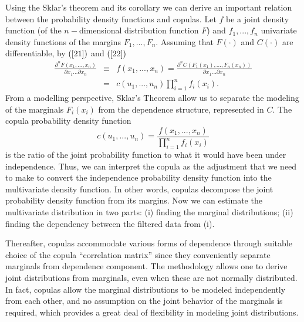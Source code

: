\documentclass[a4paper,10pt]{article}
\begin{document}
Using the Sklar's theorem and its corollary we can derive an important
relation between the probability density functions and copulas. Let $f$ be a
joint density function (of the $n-$dimensional distribution function $F$)
and $f_{1},...,f_{n}$ univariate density functions of the margins $%
F_{1},...,F_{n}$. Assuming that $F\left( \cdot \right) $ and $C\left( \cdot
\right) $ are differentiable, by $\left( \ref{21}\right) $ and $\left( \ref%
{22}\right) $
\begin{eqnarray}
\frac{\partial ^{n}F\left( x_{1},...,x_{n}\right) }{\partial
	x_{1}...\partial x_{n}} &\equiv &f\left( x_{1},...,x_{n}\right) =\frac{
	\partial ^{n}C\left( F_{1}\left( x_{1}\right) ,...,F_{n}\left( x_{n}\right)
	\right) }{\partial x_{1}...\partial x_{n}} \\
&=&c\left( u_{1},...,u_{n}\right) \prod_{i=1}^{n}f_{i}\left( x_{i}\right) .
\label{23}
\end{eqnarray}%
From a modelling perspective, Sklar's Theorem allow us to separate the
modeling of the marginals $F_{i}\left( x_{i}\right) $ from the dependence
structure, represented in $C$. The copula probability density function
\begin{equation}
c\left( u_{1},...,u_{n}\right) =\frac{f\left( x_{1},...,x_{n}\right) }{
	\prod_{i=1}^{n}f_{i}\left( x_{i}\right) }  \label{24}
\end{equation}%
is the ratio of the joint probability function to what it would have been
under independence. Thus, we can interpret the copula as the adjustment that
we need to make to convert the independence probability density function
into the multivariate density function. In other words, copulas decompose
the joint probability density function from its margins. Now we can estimate
the multivariate distribution in two parts: (i) finding the marginal
distributions; (ii) finding the dependency between the filtered data from
(i). 

Thereafter, copulas accommodate various forms of dependence through suitable choice of the copula ``correlation matrix'' since they conveniently separate marginals from dependence component. The methodology allows one to derive joint distributions from marginals, even when these are not normally distributed. In fact, copulas allow the marginal distributions to be modeled independently from each other, and no assumption on the joint behavior of the marginals is required, which provides a great deal of flexibility in modeling joint distributions.

\end{document}
